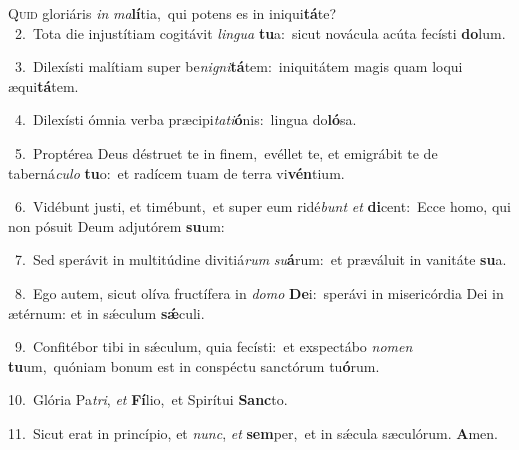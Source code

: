 \lettrine{\initial\textcolor{\initialcolor}{Q}}{uid} gloriáris \textit{in} \textit{ma}\-\textbf{lí}tia,~\star qui potens es in iniqui\-\textbf{tá}\-te?\\
{\numbfont\textcolor{\numbcolor}{~2.}}~Tota die injustítiam cogitávit \textit{lin}\-\textit{gua} \textbf{tu}\-a:~\star sicut novácula acúta fecísti \textbf{do}\-lum.\par
{\numbfont\textcolor{\numbcolor}{~3.}}~Dilexísti malítiam super be\-\textit{ni}\-\textit{gni}\textbf{tá}tem:~\star iniquitátem magis quam loqui æqui\-\textbf{tá}\-tem.\par
{\numbfont\textcolor{\numbcolor}{~4.}}~Dilexísti ómnia verba præcipi\-\textit{ta}\-\textit{ti}\textbf{ó}nis:~\star lingua do\-\textbf{ló}\-sa.\par
{\numbfont\textcolor{\numbcolor}{~5.}}~Proptérea Deus déstruet te in finem,~\dagger evéllet te, et emigrábit te de taberná\-\textit{cu}\-\textit{lo} \textbf{tu}\-o:~\star et radícem tuam de terra vi\-\textbf{vén}\-tium.\par
{\numbfont\textcolor{\numbcolor}{~6.}}~Vidébunt justi, et timébunt,~\dagger et super eum ridé\textit{bunt} \textit{et} \textbf{di}\-cent:~\star Ecce homo, qui non pósuit Deum adjutórem \textbf{su}\-um:\par
{\numbfont\textcolor{\numbcolor}{~7.}}~Sed sperávit in multitúdine divitiá\textit{rum} \textit{su}\-\textbf{á}rum:~\star et præváluit in vanitáte \textbf{su}\-a.\par
{\numbfont\textcolor{\numbcolor}{~8.}}~Ego autem, sicut olíva fructífera in \textit{do}\-\textit{mo} \textbf{De}\-i:~\star sperávi in misericórdia Dei in ætérnum: et in sǽculum \textbf{sǽ}\-culi.\par
{\numbfont\textcolor{\numbcolor}{~9.}}~Confitébor tibi in sǽculum, quia fecísti:~\dagger et exspectábo \textit{no}\-\textit{men} \textbf{tu}\-um,~\star quóniam bonum est in conspéctu sanctórum tu\-\textbf{ó}\-rum.\par
{\numbfont\textcolor{\numbcolor}{10.}}~Glória Pa\-\textit{tri}\-, \textit{et} \textbf{Fí}\-lio,~\star et Spirítui \textbf{Sanc}\-to.\par
{\numbfont\textcolor{\numbcolor}{11.}}~Sicut erat in princípio, et \textit{nunc}\-, \textit{et} \textbf{sem}\-per,~\star et in sǽcula sæculórum. \textbf{A}\-men.\par
